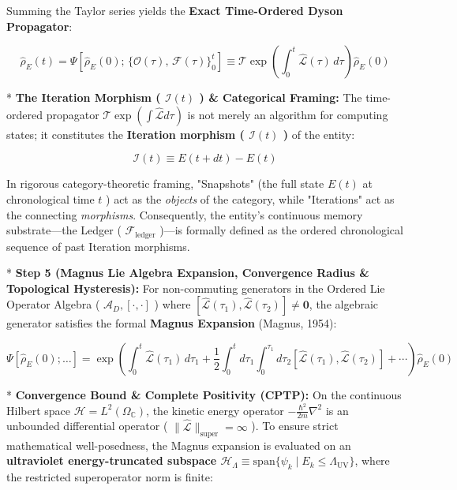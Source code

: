 \documentclass[11pt,a4paper]{article}
\theoremstyle{definition}
\theoremstyle{remark}
\begin{document}
Summing the Taylor series yields the \textbf{Exact Time-Ordered Dyson Propagator}:


\begin{equation}
\boxed{\hat{\rho}_E(t) = \Psi[\hat{\rho}_E(0);\, \{\mathcal{O}(\tau),\, \mathcal{F}(\tau)\}_{0}^{t}] \equiv \mathcal{T} \exp \left( \int_0^t \hat{\mathcal{L}}(\tau) \, d\tau \right) \hat{\rho}_E(0)}
\end{equation}


* \textbf{The Iteration Morphism ( $\mathcal{I}(t)$ ) \& Categorical Framing:}
The time-ordered propagator $\mathcal{T} \exp(\int \hat{\mathcal{L}} d\tau)$ is not merely an algorithm for computing states; it constitutes the \textbf{Iteration morphism ( $\mathcal{I}(t)$ )} of the entity:


\begin{equation}
\boxed{\mathcal{I}(t) \equiv E(t+dt) - E(t)}
\end{equation}


In rigorous category-theoretic framing, "Snapshots" (the full state $E(t)$ at chronological time $t$ ) act as the \textit{objects} of the category, while "Iterations" act as the connecting \textit{morphisms}. Consequently, the entity's continuous memory substrate—the Ledger ( $\mathcal{F}_{\text{ledger}}$ )—is formally defined as the ordered chronological sequence of past Iteration morphisms.

* \textbf{Step 5 (Magnus Lie Algebra Expansion, Convergence Radius \& Topological Hysteresis):}
For non-commuting generators in the Ordered Lie Operator Algebra ( $\mathcal{A}_D, [ \cdot, \cdot ]$ ) where $[ \hat{\mathcal{L}}(\tau_1), \hat{\mathcal{L}}(\tau_2) ] \neq \mathbf{0}$, the algebraic generator satisfies the formal \textbf{Magnus Expansion} (Magnus, 1954):


\begin{equation}
\Psi[\hat{\rho}_E(0); \dots] = \exp\left( \int_0^t \hat{\mathcal{L}}(\tau_1) \, d\tau_1 + \frac{1}{2} \int_0^t d\tau_1 \int_0^{\tau_1} d\tau_2 [ \hat{\mathcal{L}}(\tau_1), \hat{\mathcal{L}}(\tau_2) ] + \cdots \right) \hat{\rho}_E(0)
\end{equation}


* \textbf{Convergence Bound \& Complete Positivity (CPTP):} On the continuous Hilbert space $\mathcal{H} = L^2(\Omega_{\mathbb{C}})$, the kinetic energy operator $-\frac{\hbar^2}{2m}\nabla^2$ is an unbounded differential operator ( $\|\hat{\mathcal{L}}\|_{\text{super}} = \infty$ ). To ensure strict mathematical well-posedness, the Magnus expansion is evaluated on an \textbf{ultraviolet energy-truncated subspace $\mathcal{H}_{\Lambda} \equiv \mathrm{span}\{\psi_k \mid E_k \le \Lambda_{\text{UV}}\}$}, where the restricted superoperator norm is finite:
\end{document}
